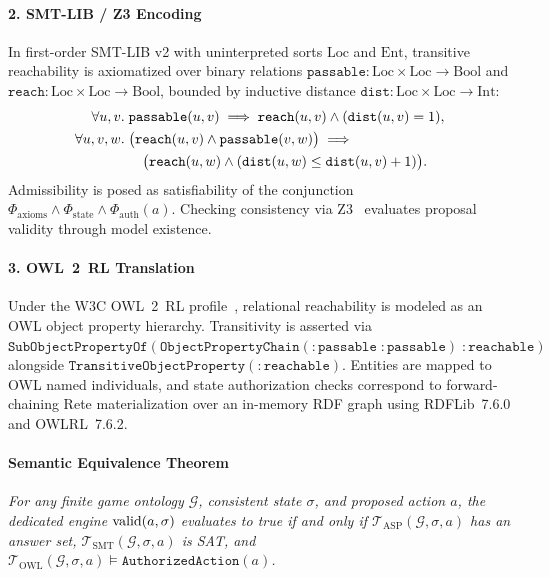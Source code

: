 \paragraph{2. SMT-LIB / Z3 Encoding}
In first-order SMT-LIB v2 with uninterpreted sorts $\text{Loc}$ and $\text{Ent}$, transitive reachability is axiomatized over binary relations $\texttt{passable}: \text{Loc} \times \text{Loc} \to \text{Bool}$ and $\texttt{reach}: \text{Loc} \times \text{Loc} \to \text{Bool}$, bounded by inductive distance $\texttt{dist}: \text{Loc} \times \text{Loc} \to \text{Int}$:
\begin{align}
\forall u, v.\; &\texttt{passable}(u, v) \implies \texttt{reach}(u, v) \land (\texttt{dist}(u, v) = 1), \label{eq:smt-base} \\
\forall u, v, w.\; &\bigl(\texttt{reach}(u, v) \land \texttt{passable}(v, w)\bigr) \implies \notag \\
&\quad \bigl(\texttt{reach}(u, w) \land (\texttt{dist}(u, w) \le \texttt{dist}(u, v) + 1)\bigr). \label{eq:smt-trans}
\end{align}
Admissibility is posed as satisfiability of the conjunction $\Phi_{\mathrm{axioms}} \land \Phi_{\mathrm{state}} \land \Phi_{\mathrm{auth}}(a)$. Checking consistency via Z3~\cite{demoura2008z3} evaluates proposal validity through model existence.

\paragraph{3. OWL~2~RL Translation}
Under the W3C OWL~2~RL profile~\cite{motik2012owl2profiles}, relational reachability is modeled as an OWL object property hierarchy. Transitivity is asserted via $\texttt{SubObjectPropertyOf}(\texttt{ObjectPropertyChain}(:\texttt{passable} \; :\texttt{passable}) \; :\texttt{reachable})$ alongside $\texttt{TransitiveObjectProperty}(:\texttt{reachable})$. Entities are mapped to OWL named individuals, and state authorization checks correspond to forward-chaining Rete materialization over an in-memory RDF graph using RDFLib~7.6.0 and OWLRL~7.6.2.

\paragraph{Semantic Equivalence Theorem}
\textit{For any finite game ontology $\mathcal{G}$, consistent state $\sigma$, and proposed action $a$, the dedicated engine $\mathrm{valid}(a, \sigma)$ evaluates to true if and only if $\mathcal{T}_{\mathrm{ASP}}(\mathcal{G}, \sigma, a)$ has an answer set, $\mathcal{T}_{\mathrm{SMT}}(\mathcal{G}, \sigma, a)$ is SAT, and $\mathcal{T}_{\mathrm{OWL}}(\mathcal{G}, \sigma, a) \models \texttt{AuthorizedAction}(a)$.}

